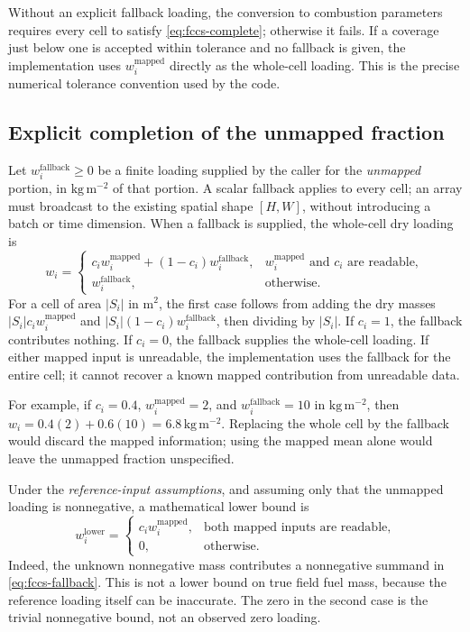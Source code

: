 \documentclass[11pt,a4paper]{article}
\begin{document}
Without an explicit fallback loading, the conversion to combustion parameters
requires every cell to satisfy \eqref{eq:fccs-complete}; otherwise it fails. If a
coverage just below one is accepted within tolerance and no fallback is given,
the implementation uses $w_i^{\mathrm{mapped}}$ directly as the whole-cell
loading. This is the precise numerical tolerance convention used by the code.

\subsection{Explicit completion of the unmapped fraction}

Let $w_i^{\mathrm{fallback}}\geq0$ be a finite loading supplied by the caller for
the \emph{unmapped} portion, in $\mathrm{kg\,m^{-2}}$ of that portion. A scalar
fallback applies to every cell; an array must broadcast to the existing spatial
shape $[H,W]$, without introducing a batch or time dimension. When a fallback
is supplied, the whole-cell dry loading is
\begin{equation}
 w_i=
 \begin{cases}
 c_i w_i^{\mathrm{mapped}}
 +(1-c_i)w_i^{\mathrm{fallback}},
 &w_i^{\mathrm{mapped}}\text{ and }c_i\text{ are readable},\\[2pt]
 w_i^{\mathrm{fallback}},
 &\text{otherwise}.
 \end{cases}
 \label{eq:fccs-fallback}
\end{equation}
For a cell of area $|S_i|$ in $\mathrm{m^2}$, the first case follows from adding
the dry masses $|S_i| c_i w_i^{\mathrm{mapped}}$ and
$|S_i|(1-c_i)w_i^{\mathrm{fallback}}$, then dividing by $|S_i|$. If $c_i=1$, the
fallback contributes nothing. If $c_i=0$, the fallback supplies the whole-cell
loading. If either mapped input is unreadable, the implementation uses the
fallback for the entire cell; it cannot recover a known mapped contribution
from unreadable data.

For example, if $c_i=0.4$, $w_i^{\mathrm{mapped}}=2$, and
$w_i^{\mathrm{fallback}}=10$ in $\mathrm{kg\,m^{-2}}$, then
$w_i=0.4(2)+0.6(10)=6.8\,\mathrm{kg\,m^{-2}}$. Replacing the whole cell by the
fallback would discard the mapped information; using the mapped mean alone
would leave the unmapped fraction unspecified.

Under the \emph{reference-input assumptions}, and assuming only that the
unmapped loading is nonnegative, a mathematical lower bound is
\begin{equation}
 w_i^{\mathrm{lower}}=
 \begin{cases}
 c_i w_i^{\mathrm{mapped}},&\text{both mapped inputs are readable},\\
 0,&\text{otherwise}.
 \end{cases}
 \label{eq:fccs-lower}
\end{equation}
Indeed, the unknown nonnegative mass contributes a nonnegative summand in
\eqref{eq:fccs-fallback}. This is not a lower bound on true field fuel mass,
because the reference loading itself can be inaccurate. The zero in the second
case is the trivial nonnegative bound, not an observed zero loading.
\end{document}
